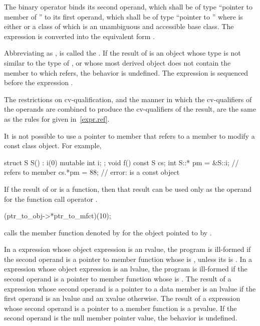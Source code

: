 \pnum
The binary operator \tcode{->*} binds its second operand, which shall be
of type ``pointer to member of '' to its first operand, which shall be of
type ``pointer to ''
where  is either  or
a class of which 
is an unambiguous and accessible base class.
The expression  is converted into the equivalent form
.

\pnum
Abbreviating  as , 
is called the .
If the result of  is an object
whose type is not similar to the type of , or
whose most derived object does not
contain the member to which
 refers, the behavior is undefined.
The expression  is sequenced before the expression .

\pnum
The restrictions on cv-qualification, and the manner in which
the cv-qualifiers of the operands are combined to produce the
cv-qualifiers of the result, are the same as the rules for
 given in~\ref{expr.ref}.
\begin{note}
It is not possible to use a pointer to member that refers to a
 member to modify a const class object. For
example,
\begin{codeblock}
struct S {
  S() : i(0) { }
  mutable int i;
};
void f()
{
  const S cs;
  int S::* pm = &S::i;          //  refers to  member 
  cs.*pm = 88;                  // error:  is a const object
}
\end{codeblock}
\end{note}

\pnum
{}%
If the result of  or \tcode{->*} is a function, then that
result can be used only as the operand for the function call operator
\tcode{()}.
\begin{example}
\begin{codeblock}
(ptr_to_obj->*ptr_to_mfct)(10);
\end{codeblock}
calls the member function denoted by  for the object
pointed to by .
\end{example}
In a  expression whose object expression is an rvalue, the program is
ill-formed if the second operand is a pointer to member function
whose  is \tcode{\&},
unless its  is .
In a 
expression whose object expression is an lvalue, the program is ill-formed if the second
operand is
a pointer to member function
whose  is \tcode{\&\&}.
The result of a  expression
whose second operand is a pointer to a data member is an lvalue if the first
operand is an lvalue and an xvalue otherwise. The result of a  expression whose
second operand is a pointer to a member function is a prvalue.
If the second operand is the null
member pointer value, the behavior is undefined.

